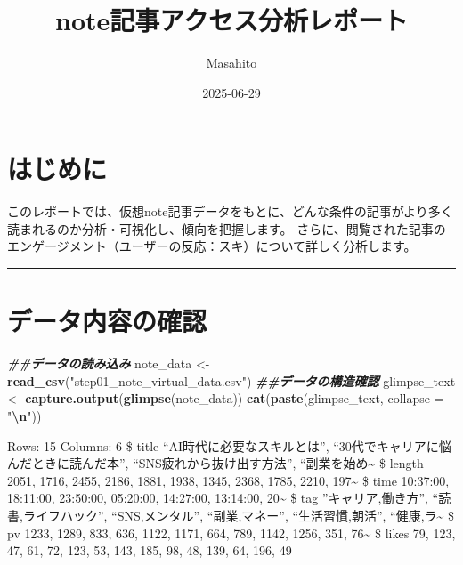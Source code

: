 \documentclass[
]{article}
\title{note記事アクセス分析レポート}
\author{Masahito}
\date{2025-06-29}
\newenvironment{Shaded}{\begin{snugshade}}{\end{snugshade}}
\newcommand{\AttributeTok}[1]{\textcolor[rgb]{0.13,0.29,0.53}{#1}}
\newcommand{\DocumentationTok}[1]{\textcolor[rgb]{0.56,0.35,0.01}{\textbf{\textit{#1}}}}
\newcommand{\FunctionTok}[1]{\textcolor[rgb]{0.13,0.29,0.53}{\textbf{#1}}}
\newcommand{\NormalTok}[1]{#1}
\newcommand{\OtherTok}[1]{\textcolor[rgb]{0.56,0.35,0.01}{#1}}
\newcommand{\SpecialCharTok}[1]{\textcolor[rgb]{0.81,0.36,0.00}{\textbf{#1}}}
\newcommand{\StringTok}[1]{\textcolor[rgb]{0.31,0.60,0.02}{#1}}
\begin{document}
\maketitle

{
\setcounter{tocdepth}{2}
\tableofcontents
}
\section{はじめに}\label{ux306fux3058ux3081ux306b}

このレポートでは、仮想note記事データをもとに、どんな条件の記事がより多く読まれるのか分析・可視化し、傾向を把握します。
さらに、閲覧された記事のエンゲージメント（ユーザーの反応：スキ）について詳しく分析します。

\begin{center}\rule{0.5\linewidth}{0.5pt}\end{center}

\section{データ内容の確認}\label{ux30c7ux30fcux30bfux5185ux5bb9ux306eux78baux8a8d}

\begin{Shaded}
\begin{Highlighting}[]
\DocumentationTok{\#\#データの読み込み}
\NormalTok{note\_data }\OtherTok{\textless{}{-}} \FunctionTok{read\_csv}\NormalTok{(}\StringTok{"step01\_note\_virtual\_data.csv"}\NormalTok{)}
\DocumentationTok{\#\#データの構造確認}
\NormalTok{glimpse\_text }\OtherTok{\textless{}{-}} \FunctionTok{capture.output}\NormalTok{(}\FunctionTok{glimpse}\NormalTok{(note\_data))}
\FunctionTok{cat}\NormalTok{(}\FunctionTok{paste}\NormalTok{(glimpse\_text, }\AttributeTok{collapse =} \StringTok{"}\SpecialCharTok{\textbackslash{}n}\StringTok{"}\NormalTok{))}
\end{Highlighting}
\end{Shaded}

Rows: 15 Columns: 6 \$ title ``AI時代に必要なスキルとは'',
``30代でキャリアに悩んだときに読んだ本'', ``SNS疲れから抜け出す方法'',
``副業を始め\textasciitilde{} \$ length 2051, 1716, 2455, 2186, 1881,
1938, 1345, 2368, 1785, 2210, 197\textasciitilde{} \$ time 10:37:00,
18:11:00, 23:50:00, 05:20:00, 14:27:00, 13:14:00, 20\textasciitilde{} \$
tag ''キャリア,働き方'', ``読書,ライフハック'', ``SNS,メンタル'',
``副業,マネー'', ``生活習慣,朝活'', ``健康,ラ\textasciitilde{} \$ pv
1233, 1289, 833, 636, 1122, 1171, 664, 789, 1142, 1256, 351,
76\textasciitilde{} \$ likes 79, 123, 47, 61, 72, 123, 53, 143, 185, 98,
48, 139, 64, 196, 49
\end{document}
